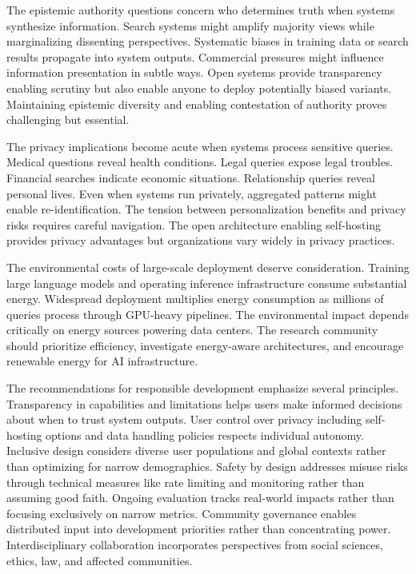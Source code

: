 The epistemic authority questions concern who determines truth when systems synthesize information. Search systems might amplify majority views while marginalizing dissenting perspectives. Systematic biases in training data or search results propagate into system outputs. Commercial pressures might influence information presentation in subtle ways. Open systems provide transparency enabling scrutiny but also enable anyone to deploy potentially biased variants. Maintaining epistemic diversity and enabling contestation of authority proves challenging but essential.

The privacy implications become acute when systems process sensitive queries. Medical questions reveal health conditions. Legal queries expose legal troubles. Financial searches indicate economic situations. Relationship queries reveal personal lives. Even when systems run privately, aggregated patterns might enable re-identification. The tension between personalization benefits and privacy risks requires careful navigation. The open architecture enabling self-hosting provides privacy advantages but organizations vary widely in privacy practices.

The environmental costs of large-scale deployment deserve consideration. Training large language models and operating inference infrastructure consume substantial energy. Widespread deployment multiplies energy consumption as millions of queries process through GPU-heavy pipelines. The environmental impact depends critically on energy sources powering data centers. The research community should prioritize efficiency, investigate energy-aware architectures, and encourage renewable energy for AI infrastructure.

The recommendations for responsible development emphasize several principles. Transparency in capabilities and limitations helps users make informed decisions about when to trust system outputs. User control over privacy including self-hosting options and data handling policies respects individual autonomy. Inclusive design considers diverse user populations and global contexts rather than optimizing for narrow demographics. Safety by design addresses misuse risks through technical measures like rate limiting and monitoring rather than assuming good faith. Ongoing evaluation tracks real-world impacts rather than focusing exclusively on narrow metrics. Community governance enables distributed input into development priorities rather than concentrating power. Interdisciplinary collaboration incorporates perspectives from social sciences, ethics, law, and affected communities.

